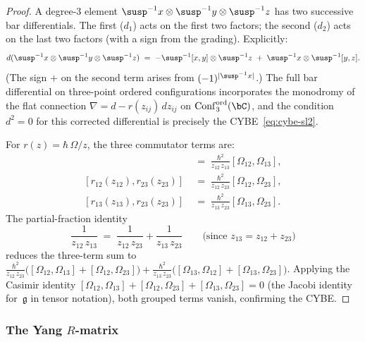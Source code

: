 \begin{proof}
A degree-$3$ element $\susp^{-1}x\otimes \susp^{-1}y\otimes \susp^{-1}z$ has
two successive bar differentials. The first ($d_1$) acts on the
first two factors; the second ($d_2$) acts on the last two factors (with
a sign from the grading). Explicitly:
\[
d(\susp^{-1}x\otimes \susp^{-1}y\otimes \susp^{-1}z)
\;=\;
-\susp^{-1}[x,y]\otimes \susp^{-1}z
\;+\;
\susp^{-1}x\otimes \susp^{-1}[y,z].
\]
(The sign $+$ on the second term arises from $(-1)^{|\susp^{-1}x|}$.)
The full bar differential on three-point ordered configurations
incorporates the monodromy of the flat connection
$\nabla=d-r(z_{ij})\,dz_{ij}$ on
$\operatorname{Conf}_3^{\mathrm{ord}}(\bC)$, and the condition
$d^2=0$ for this corrected differential is precisely the CYBE~\eqref{eq:cybe-sl2}.

For $r(z)=\hbar\,\Omega/z$, the three commutator terms are:
\begin{align*}
[r_{12}(z_{12}),r_{13}(z_{13})]
&\;=\;\frac{\hbar^2}{z_{12}\,z_{13}}[\Omega_{12},\Omega_{13}],\\
[r_{12}(z_{12}),r_{23}(z_{23})]
&\;=\;\frac{\hbar^2}{z_{12}\,z_{23}}[\Omega_{12},\Omega_{23}],\\
[r_{13}(z_{13}),r_{23}(z_{23})]
&\;=\;\frac{\hbar^2}{z_{13}\,z_{23}}[\Omega_{13},\Omega_{23}].
\end{align*}
The partial-fraction identity
\[
\frac{1}{z_{12}\,z_{13}}\;=\;\frac{1}{z_{12}\,z_{23}}+\frac{1}{z_{13}\,z_{23}}
\qquad\text{(since }z_{13}=z_{12}+z_{23}\text{)}
\]
reduces the three-term sum to
$\frac{\hbar^2}{z_{12}\,z_{23}}
\bigl([\Omega_{12},\Omega_{13}]+[\Omega_{12},\Omega_{23}]\bigr)
+\frac{\hbar^2}{z_{13}\,z_{23}}
\bigl([\Omega_{13},\Omega_{12}]+[\Omega_{13},\Omega_{23}]\bigr)$.
Applying the Casimir identity
$[\Omega_{12},\Omega_{13}]+[\Omega_{12},\Omega_{23}]+[\Omega_{13},\Omega_{23}]=0$
(the Jacobi identity for~$\mathfrak g$ in tensor notation),
both grouped terms vanish, confirming the CYBE.
\end{proof}

\subsubsection*{The Yang $R$-matrix}

